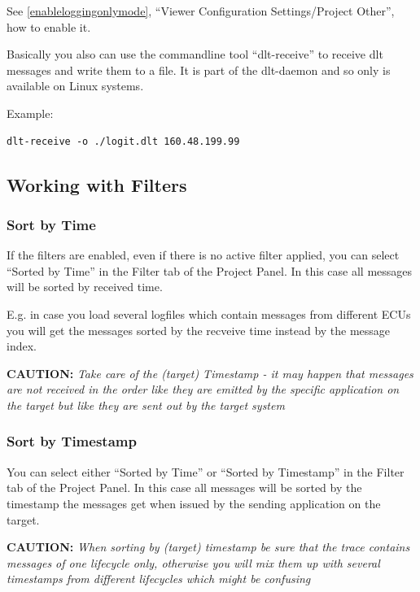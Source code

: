 \documentclass[a4paper,11pt]{article}
\newcommand{\caution}[1]{\begin{ibox} \textbf{CAUTION:} \emph{#1} \end{ibox}}
\begin{document}
See \autoref{enableloggingonlymode}, ``Viewer Configuration Settings/Project Other'', how to enable it.

Basically you also can use the commandline tool ``dlt-receive'' to receive dlt messages and write them to a file.
It is part of the dlt-daemon and so only is available on Linux systems.

Example:

\begin{verbatim}
dlt-receive -o ./logit.dlt 160.48.199.99
\end{verbatim}



\pagebreak

\subsection{Working with Filters}
\label{workingwithfilters}


\subsubsection{Sort by Time}
\label{sortbytime}
If the filters are enabled, even if there is no active filter applied, you can select ``Sorted by Time'' in the
Filter tab of the Project Panel. In this case all messages will be sorted by received time.

E.g. in case you load several logfiles which contain messages from different ECUs you will get the messages sorted by the recveive time instead by the message index.

\caution{Take care of the (target) Timestamp - it may happen that messages are not received in the order
like they are emitted by the specific application on the target but like they are sent out by the target system}

\subsubsection{Sort by Timestamp}
\label{sortbytimestamp}
You can select either ``Sorted by Time'' or ``Sorted by Timestamp'' in the
Filter tab of the Project Panel. In this case all messages will be sorted by the timestamp the messages get when issued
by the sending application on the target. 

\caution{When sorting by (target) timestamp be sure that the trace contains messages of one lifecycle only, otherwise you will mix them up with
several timestamps from different lifecycles which might be confusing}
\end{document}
